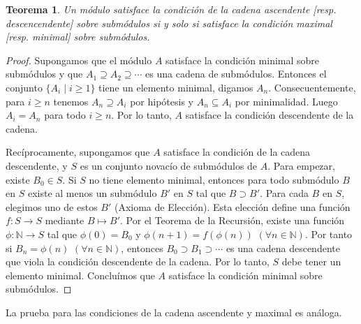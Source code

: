 \documentclass{report}
\newcommand{\naturalNumbers}{\mathbb{N}}
\newtheorem{theorem}{Teorema}
\begin{document}
  \begin{theorem}
    \label{theorem:equivalenceOfChainConditions}
    Un módulo satisface la condición de la cadena ascendente [resp. descencendente] sobre submódulos si y solo si satisface la condición maximal [resp. minimal] sobre submódulos.
  \end{theorem}
  \begin{proof}
    Supongamos que el módulo \(A\) satisface la condición minimal sobre submódulos y que \(A_1 \supseteq A_2 \supseteq \cdots\) es una cadena de submódulos.
    Entonces el conjunto \(\{A_i \mid i \geq 1\}\) tiene un elemento minimal, digamos \(A_n\).
    Consecuentemente, para \(i \geq n\) tenemos \(A_n \supseteq A_i\) por hipótesis y \(A_n \subseteq A_i\) por minimalidad. Luego \(A_i = A_n\) para todo \(i \geq n\).
    Por lo tanto, \(A\) satisface la condición descendente de la cadena.

    Recíprocamente, supongamos que \(A\) satisface la condición de la cadena descendente, y \(S\) es un conjunto novacío de submódulos de \(A\).
    Para empezar, existe \(B_0 \in S\).
    Si \(S\) no tiene elemento minimal, entonces para todo submódulo \(B\) en \(S\) existe al menos un submódulo \(B'\) en \(S\) tal que \(B \supset B'\).
    Para cada \(B\) en \(S\), elegimos uno de estos \(B'\) (Axioma de Elección).
    Esta elección define una función \(f : S \rightarrow S\) mediante \(B \mapsto B'\).
    Por el Teorema de la Recursión, existe una función \(\phi : \naturalNumbers \rightarrow S\) tal que \(\phi(0) = B_0\) y \(\phi(n + 1) = f(\phi(n))\) \((\forall n \in \naturalNumbers)\).
    Por tanto si \(B_n = \phi(n)\) \((\forall n \in \naturalNumbers)\), entonces \(B_0 \supset B_1 \supset \cdots\) es una cadena descendente que viola la condición descendente de la cadena.
    Por lo tanto, \(S\) debe tener un elemento minimal.
    Concluímos que \(A\) satisface la condición minimal sobre submódulos.
  \end{proof}
  La prueba para las condiciones de la cadena ascendente y maximal es análoga.
\end{document}
